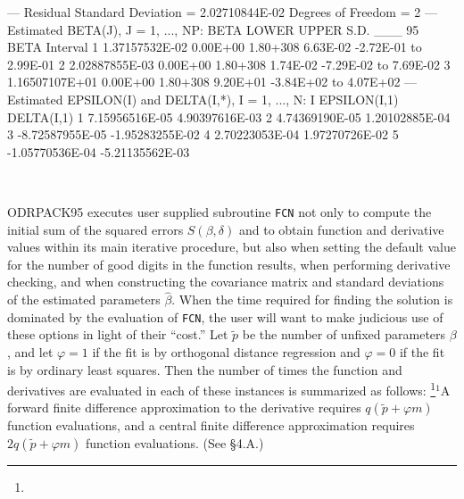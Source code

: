 {{\phantom{blank line}
 --- Residual Standard Deviation          =                     2.02710844E-02
         Degrees of Freedom               =    2
\phantom{blank line}
 --- Estimated BETA(J), J = 1, ..., NP:
\phantom{blank line}
                     BETA      LOWER     UPPER      S.D.  ___ 95%
                                                    BETA         Interval
\phantom{blank line}
       1   1.37157532E-02   0.00E+00  1.80+308  6.63E-02  -2.72E-01 to  2.99E-01
       2   2.02887855E-03   0.00E+00  1.80+308  1.74E-02  -7.29E-02 to  7.69E-02
       3   1.16507107E+01   0.00E+00  1.80+308  9.20E+01  -3.84E+02 to  4.07E+02
\phantom{blank line}
 --- Estimated EPSILON(I) and DELTA(I,*), I = 1, ..., N:
\phantom{blank line}
         I    EPSILON(I,1)      DELTA(I,1)
\phantom{blank line}
         1  7.15956516E-05  4.90397616E-03
         2  4.74369190E-05  1.20102885E-04
         3 -8.72587955E-05 -1.95283255E-02
         4  2.70223053E-04  1.97270726E-02
         5 -1.05770536E-04 -5.21135562E-03
}}
\vfil\eject

\ \vskip 1.4in
\def\thissection{When the Model Is Very Time Consuming}
\bigskip\bigskip

\noindent ODRPACK95 executes user supplied subroutine {\tt FCN} not only to compute the initial sum of the squared errors $S(\beta,\delta)$ and to obtain function and derivative values within its main iterative procedure, but also when setting the default value for the number of good digits in the function results, when performing derivative checking, and when constructing the covariance matrix and standard deviations of the estimated parameters $\hat{\beta}$. When the time required for finding the solution is dominated by the evaluation of {\tt FCN}, the user will want to make judicious use of these options in light of their ``cost.'' Let $\tilde p$ be the number of unfixed parameters $\beta$, and let $\varphi = 1$ if the fit is by orthogonal distance regression and $\varphi = 0$ if the fit is by ordinary least squares. Then the number of times the function and derivatives are evaluated in each of these instances is summarized as follows:
\medskip
\vbox{}\footnote{}{$^1$\rmVIII A forward finite difference approximation to the derivative requires $q(\tilde p +\varphi m)$ function evaluations, and a central finite
difference approximation requires $2q(\tilde p +\varphi m)$ function
evaluations. (See \S 4.A.)}

